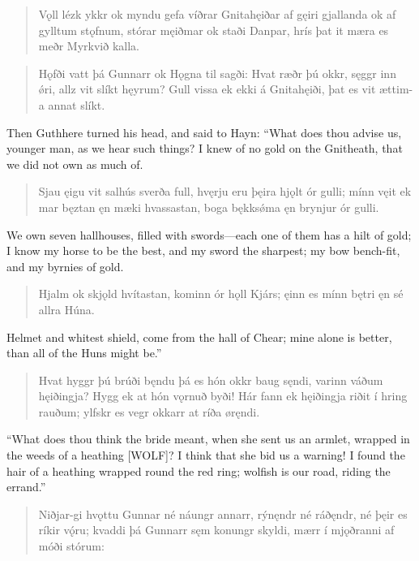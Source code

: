 \begin{verse}
\bva Vǫll lézk ykkr ok myndu gefa \hld víðrar Gnitahęiðar
af gęiri gjallanda \hld ok af gylltum stǫfnum,
stórar męiðmar \hld ok staði Danpar,
hrís þat it mæra \hld es meðr Myrkvið kalla. 
\end{verse}

\begin{verse}
\bva Hǫfði vatt þá Gunnarr \hld ok Hǫgna til sagði:
Hvat ræðr þú okkr, sęggr inn ǿri, \hld allz vit slíkt hęyrum?
Gull vissa ek ekki \hld á Gnitahęiði,
þat es vit ættim-a \hld annat slíkt.
\end{verse}

\bvb Then Guthhere turned his head, and said to Hayn: “What does thou advise us, younger man, as we hear such things? I knew of no gold on the Gnitheath, that we did not own as much of.

\begin{verse}
\bva Sjau ęigu vit salhús \hld sverða full,
hvęrju eru þęira \hld hjǫlt ór gulli;
mínn vęit ek mar bęztan \hld ęn mæki hvassastan,
boga bękksǿma \hld ęn brynjur ór gulli. 
\end{verse}

\bvb We own seven hallhouses, filled with swords—each one of them has a hilt of gold; I know my horse to be the best, and my sword the sharpest; my bow bench-fit, and my byrnies of gold.

\begin{verse}
\bva Hjalm ok skjǫld hvítastan, \hld kominn ór hǫll Kjárs;
ęinn es mínn bętri \hld ęn sé allra Húna. 
\end{verse}

\bvb Helmet and whitest shield, come from the hall of Chear; mine alone is better, than all of the Huns might be.”

\begin{verse}
\bva Hvat hyggr þú brúði bęndu \hld þá es hón okkr baug sęndi,
varinn váðum hęiðingja? \hld Hygg ek at hón vǫrnuð byði!
Hár fann ek hęiðingja \hld riðit í hring rauðum;
ylfskr es vegr okkarr \hld at ríða øręndi. 
\end{verse}

\bvb “What does thou think the bride meant, when she sent us an armlet, wrapped in the weeds of a heathing [WOLF]? I think that she bid us a warning! I found the hair of a heathing wrapped round the red ring; wolfish is our road, riding the errand.”

\begin{verse}
\bva Niðjar-gi hvǫttu Gunnar \hld né náungr annarr,
rýnęndr né ráðęndr, \hld né þęir es ríkir vǫ́ru;
kvaddi þá Gunnarr \hld sęm konungr skyldi,
mærr í mjǫðranni \hld af móði stórum: 
\end{verse}

